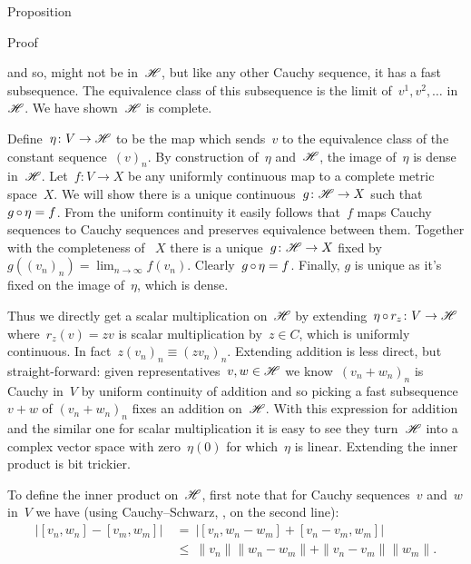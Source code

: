 \documentclass[b]{subfiles}
\begin{document}
\begin{parsec}
\begin{point}{Proposition}
\begin{point}{Proof}
\begin{point}
    and so, might not be in~$\mathscr{H}$,
    but like any other Cauchy sequence,
    it has a fast subsequence.
The equivalence class
of this subsequence is the limit of~$v^1, v^2, \ldots$ in~$\mathscr{H}$.
We have shown~$\mathscr{H}$ is complete.
\end{point}
\begin{point}%
Define~$\eta\colon V \to \mathscr{H}$
    to be the map which sends~$v$ to the equivalence class of the
    constant sequence~$(v)_n$.
By construction of~$\eta$ and~$\mathscr{H}$,
    the image of~$\eta$ is dense in~$\mathscr{H}$.
Let~$f\colon V \to X$
    be any uniformly continuous map to a complete metric space~$X$.
We will show there is a unique continuous~$g\colon \mathscr{H} \to X$
    such that~$g \mathop{\circ} \eta = f$.
From the uniform continuity it easily follows
    that~$f$ maps Cauchy sequences to Cauchy sequences
    and preserves equivalence between them.
Together with the completeness of ~$X$
    there is a unique~$g\colon \mathscr{H} \to X$
    fixed by~$g((v_n)_n) = \lim_{n\to\infty}f(v_n)$.
Clearly~$g \mathop{\circ} \eta = f$.
Finally, $g$ is unique as it's fixed on the image of~$\eta$, which is dense.
\end{point}
\begin{point}%
Thus we directly get a scalar multiplication
    on~$\mathscr{H}$ by extending~$\eta \mathop{\circ} r_z \colon V \to \mathscr{H}$
    where~$r_z(v) = zv$ is scalar multiplication by~$z \in C$,
    which is uniformly continuous.
In fact~$z (v_n)_n \equiv (z v_n)_n$.
Extending addition is less direct, but straight-forward:
    given representatives~$v,w \in \mathscr{H}$
    we know~$(v_n+w_n)_n$ is Cauchy in~$V$
    by uniform continuity of addition and so
    picking a fast subsequence~$v+w$ of $(v_n+w_n)_n$
        fixes an addition on~$\mathscr{H}$.
With this expression for addition and the similar one for
    scalar multiplication it is easy to see
    they turn~$\mathscr{H}$ into a complex vector space with zero~$\eta(0)$
    for which~$\eta$ is linear.
Extending the inner product is bit trickier.
\end{point}
\begin{point}%
To define the inner product on~$\mathscr{H}$,
first note that for Cauchy sequences~$v$ and~$w$ in~$V$
we have (using Cauchy--Schwarz, , on the second line):
\begin{align*}
    \bigl|[v_n,w_n] - [v_m,w_m]\bigr|
    & \ =\  \bigl|[v_n,w_n-w_m] + [v_n - v_m,w_m]\bigr| \\
    & \ \leq\  \|v_n\| \|w_n - w_m\| + \|v_n-v_m\|\|w_m\|.
\end{align*}

\end{point}
\end{point}
\end{point}
\end{parsec}
\end{document}
